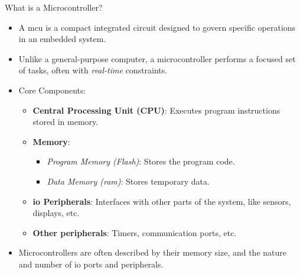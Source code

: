 \begin{frame}{What is a Microcontroller?}
    \begin{itemize}
        \item A \acf{mcu} is a compact integrated circuit designed to govern specific operations in an embedded system.
        \item Unlike a general-purpose computer, a microcontroller performs a focused set of tasks, often with \textit{real-time} constraints.
        \item Core Components:
        \begin{itemize}
            \item \textbf{Central Processing Unit (CPU)}: Executes program instructions stored in memory.
            \item \textbf{Memory}:
                \begin{itemize}
                    \item \textit{Program Memory (Flash)}: Stores the program code.
                    \item \textit{Data Memory (\acs{ram})}: Stores temporary data.
                \end{itemize}
            \item \textbf{\acf{io} Peripherals}: Interfaces with other parts of the system, like sensors, displays, etc.
            \item \textbf{Other peripherals}: Timers, communication ports, etc.
        \end{itemize}
        \item Microcontrollers are often described by their memory size, and the nature and number of \acs{io} ports and peripherals.
    \end{itemize}
\end{frame}

